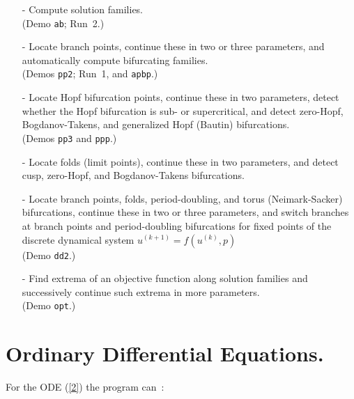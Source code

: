 \documentclass[12pt]{report}
\begin{document}
\begin{itemize}
\item[-]
  Compute solution families.\\  (Demo {\tt ab}; Run~2.) 
\item[-]
  Locate branch points, continue these in two or three parameters,
  and automatically compute
  bifurcating families. \\ (Demos {\tt pp2}; Run~1, and {\tt apbp}.)
\item[-]
  Locate Hopf bifurcation points, continue these in two
  parameters, detect whether the Hopf bifurcation is sub- or
  supercritical, and detect zero-Hopf, Bogdanov-Takens, and 
  generalized Hopf (Bautin) bifurcations.\\ (Demos {\tt pp3} and
  {\tt ppp}.)
\item[-]
  Locate folds (limit points), continue these 
  in two parameters, and detect cusp, zero-Hopf, and Bogdanov-Takens
  bifurcations. \\
\item[-]
  Locate branch points, folds, period-doubling, and torus
  (Neimark-Sacker) bifurcations, continue these in two or three
  parameters, and switch branches at branch points and
  period-doubling bifurcations
  for fixed points of the discrete dynamical system
  $u^{(k+1)}= f( u^{(k)}, p )$ \\ (Demo {\tt dd2}.)
\item[-]
  Find extrema of an objective function along solution families
  and successively continue such extrema in more parameters.
  \\ (Demo {\tt opt}.)
\end{itemize}


\section{ Ordinary Differential Equations.} \label{sec:ODEs}
For the ODE (\ref{2}) the program can~:~
 
\end{document}
